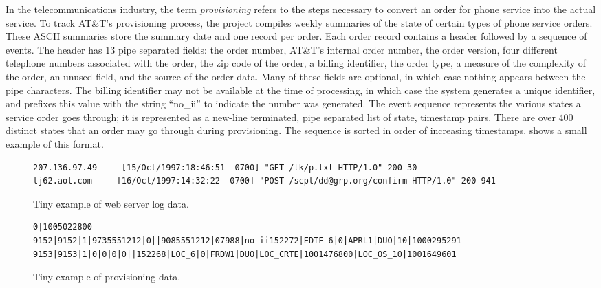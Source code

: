In the telecommunications industry, the term \textit{provisioning}
refers to the steps necessary to convert an order for phone service
into the actual service.  To track AT\&T's provisioning process, the
\dibbler{} project compiles weekly summaries of the state of certain
types of phone service orders.  These ASCII summaries store the
summary date and one record per order.  Each order record contains a
header followed by a sequence of events.  The header has 13 pipe
separated fields: the order number, AT\&T's internal order number, the
order version, four different telephone numbers associated with the
order, the zip code of the order, a billing identifier, the order
type, a measure of the complexity of the order, an unused field, and
the source of the order data.  Many of these fields are optional, in
which case nothing appears between the pipe characters.  The billing
identifier may not be available at the time of processing, in which
case the system generates a unique identifier, and prefixes this value
with the string ``no\_ii'' to indicate the number was generated. The
event sequence represents the various states a service order goes
through; it is represented as a new-line terminated, pipe separated
list of state, timestamp pairs.  There are over 400 distinct states
that an order may go through during provisioning.  The sequence is
sorted in order of increasing
timestamps.  shows a small example of
this format.


\begin{figure*}[t!]
\begin{footnotesize}
\begin{verbatim}
207.136.97.49 - - [15/Oct/1997:18:46:51 -0700] "GET /tk/p.txt HTTP/1.0" 200 30
tj62.aol.com - - [16/Oct/1997:14:32:22 -0700] "POST /scpt/dd@grp.org/confirm HTTP/1.0" 200 941
\end{verbatim}
\end{footnotesize}
\caption{Tiny example of web server log data.}
\label{figure:clf-records}
\end{figure*}

\begin{figure*}
\begin{footnotesize}
\begin{verbatim}
0|1005022800
9152|9152|1|9735551212|0||9085551212|07988|no_ii152272|EDTF_6|0|APRL1|DUO|10|1000295291
9153|9153|1|0|0|0|0||152268|LOC_6|0|FRDW1|DUO|LOC_CRTE|1001476800|LOC_OS_10|1001649601
\end{verbatim}
\end{footnotesize}
\caption{Tiny example of \dibbler{} provisioning data.}
\label{figure:dibbler-records}
\end{figure*}

